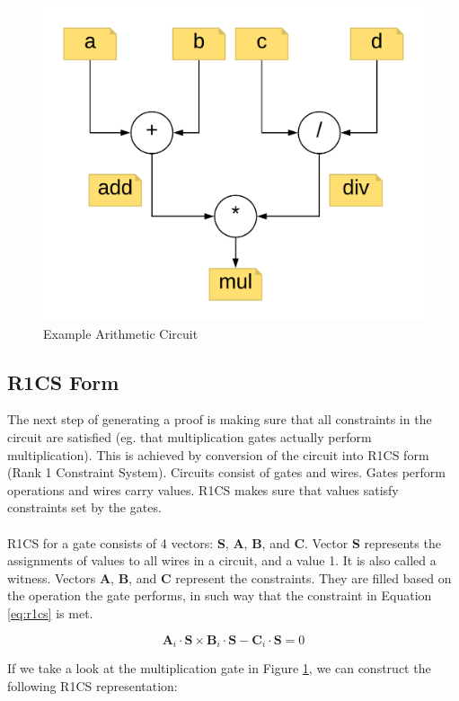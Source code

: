 \begin{figure}[h]
    \centering
    \includegraphics[width=.75\linewidth]{Figures/Circuit.png}
    \caption{Example Arithmetic Circuit}
    \label{fig:circuit}
\end{figure}

\FloatBarrier
\subsection{R1CS Form}
The next step of generating a proof is making sure that all constraints in the circuit are satisfied (eg. that multiplication gates actually perform multiplication). This is achieved by conversion of the circuit into R1CS form (Rank 1 Constraint System). Circuits consist of gates and wires. Gates perform operations and wires carry values. R1CS makes sure that values satisfy constraints set by the gates.\\
\\
R1CS for a gate consists of 4 vectors: \textbf{S}, \textbf{A}, \textbf{B}, and \textbf{C}. Vector \textbf{S} represents the assignments of values to all wires in a circuit, and a value 1. It is also called a witness. Vectors \textbf{A}, \textbf{B}, and \textbf{C} represent the constraints. They are filled based on the operation the gate performs, in such way that the constraint in Equation \ref{eq:r1cs} is met.

\begin{equation}
    \label{eq:r1cs}
    \textbf{A}_i \cdot \textbf{S} \times \textbf{B}_i \cdot \textbf{S} - \textbf{C}_i \cdot \textbf{S} = 0
\end{equation}

\noindent If we take a look at the multiplication gate in Figure \ref{fig:circuit}, we can construct the following R1CS representation:

